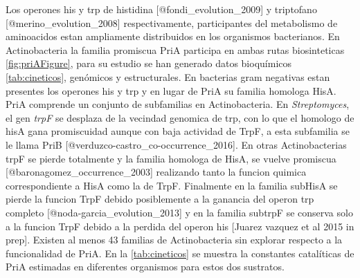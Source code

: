 \documentclass[]{article}
\begin{document}
Los operones his y trp de histidina {[}@fondi\_evolution\_2009{]} y
triptofano {[}@merino\_evolution\_2008{]} respectivamente, participantes
del metabolismo de aminoacidos estan ampliamente distribuidos en los
organismos bacterianos. En Actinobacteria la familia promiscua PriA
participa en ambas rutas biosinteticas \autoref{fig:priAFigure}, para su
estudio se han generado datos bioquímicos \autoref{tab:cineticos},
genómicos y estructurales. En bacterias gram negativas estan presentes
los operones his y trp y en lugar de PriA su familia homologa HisA. PriA
comprende un conjunto de subfamilias en Actinobacteria. En
\emph{Streptomyces}, el gen \emph{trpF} se desplaza de la vecindad
genomica de trp, con lo que el homologo de hisA gana promiscuidad aunque
con baja actividad de TrpF, a esta subfamilia se le llama PriB
{[}@verduzco-castro\_co-occurrence\_2016{]}. En otras Actinobacterias
trpF se pierde totalmente y la familia homologa de HisA, se vuelve
promiscua {[}@baronagomez\_occurrence\_2003{]} realizando tanto la
funcion quimica correspondiente a HisA como la de TrpF. Finalmente en la
familia subHisA se pierde la funcion TrpF debido posiblemente a la
ganancia del operon trp completo {[}@noda-garcia\_evolution\_2013{]} y
en la familia subtrpF se conserva solo a la funcion TrpF debido a la
perdida del operon his {[}Juarez vazquez et al 2015 in prep{]}. Existen
al menos 43 familias de Actinobacteria sin explorar respecto a la
funcionalidad de PriA. En la \autoref{tab:cineticos} se muestra la
constantes catalíticas de PriA estimadas en diferentes organismos para
estos dos sustratos.

\clearpage    
\end{document}
